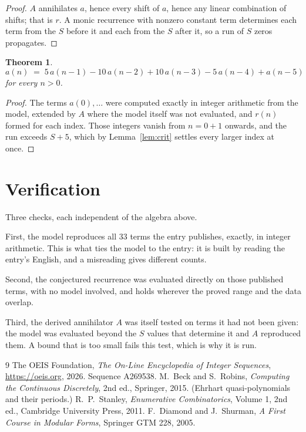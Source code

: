 \documentclass[11pt,a4paper]{article}
\theoremstyle{plain}
\newtheorem{theorem}{Theorem}
\theoremstyle{definition}
\begin{document}
\begin{proof}
$A$ annihilates $a$, hence every shift of $a$, hence any linear combination of shifts; that is
$r$. A monic recurrence with nonzero constant term determines each term from the $S$ before it
and each from the $S$ after it, so a run of $S$ zeros propagates.
\end{proof}

\begin{theorem}
\[
a(n)\;=\;5\,a(n-1) - 10\,a(n-2) + 10\,a(n-3) - 5\,a(n-4) + a(n-5)
\]
for every $n>0$.
\end{theorem}

\begin{proof}
The terms $a(0),\dots$ were computed exactly in integer arithmetic from the model, extended by
$A$ where the model itself was not evaluated, and $r(n)$ formed for each index. Those integers
vanish from $n=0+1$ onwards, and the run exceeds $S+5$, which by
Lemma~\ref{lem:crit} settles every larger index at once.
\end{proof}

\section{Verification}

Three checks, each independent of the algebra above.

First, the model reproduces all $33$ terms the entry publishes, exactly, in integer
arithmetic. This is what ties the model to the entry: it is built by reading the entry's
English, and a misreading gives different counts.

Second, the conjectured recurrence was evaluated directly on those published terms, with no
model involved, and holds wherever the proved range and the data overlap.

Third, the derived annihilator $A$ was itself tested on terms it had not been given: the model
was evaluated beyond the $S$ values that determine it and $A$ reproduced them. A bound that is
too small fails this test, which is why it is run.

\begin{thebibliography}{9}
 The OEIS Foundation, \emph{The On-Line Encyclopedia of Integer
Sequences}, \url{https://oeis.org}, 2026. Sequence A269538.
 M.~Beck and S.~Robins, \emph{Computing the Continuous Discretely},
2nd ed., Springer, 2015. (Ehrhart quasi-polynomials and their periods.)
 R.~P.~Stanley, \emph{Enumerative Combinatorics}, Volume 1, 2nd ed.,
Cambridge University Press, 2011.
 F.~Diamond and J.~Shurman, \emph{A First Course in Modular Forms},
Springer GTM 228, 2005.
\end{thebibliography}
\end{document}
